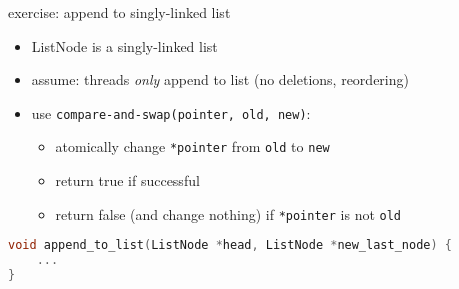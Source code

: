 \begin{frame}[fragile,label=appendToListExercise]{exercise: append to singly-linked list}
\begin{itemize}
    \item ListNode is a singly-linked list
    \item assume: threads \textit{only} append to list (no deletions, reordering)
    \item use \texttt{compare-and-swap(pointer, old, new)}:
        \begin{itemize}
        \item atomically change \texttt{*pointer} from \texttt{old} to \texttt{new}
        \item return true if successful
        \item return false (and change nothing) if \texttt{*pointer} is not \texttt{old}
        \end{itemize}
\end{itemize}
\begin{lstlisting}[language=C++,style=smaller]
void append_to_list(ListNode *head, ListNode *new_last_node) {
    ...
}
\end{lstlisting}
\end{frame}
